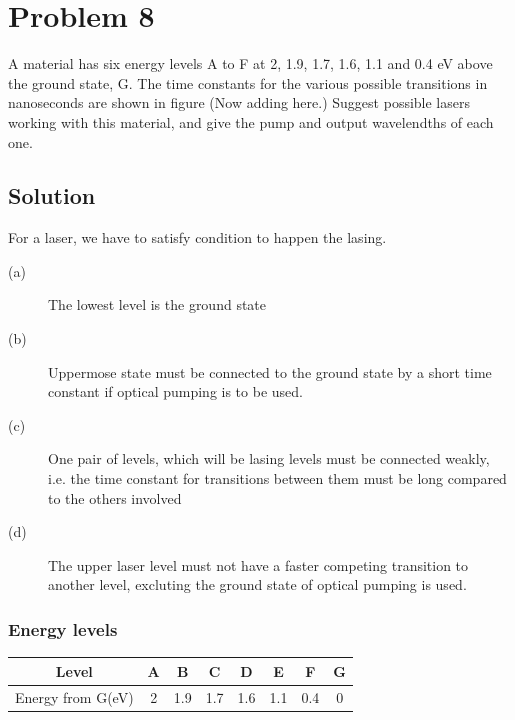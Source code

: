 \documentclass[a4paper,11pt]{article}
\begin{document}
\section*{Problem 8}
\label{sec:org0e387b5}
A material has six energy levels A to F at 2, 1.9, 1.7, 1.6, 1.1 and 0.4 eV above the ground state, G. The time constants for the various possible transitions in nanoseconds are shown in figure (Now adding here.) Suggest possible lasers working with this material, and give the pump and output wavelendths of each one.
\subsection*{Solution}
\label{sec:org515a892}

For a laser, we have to satisfy condition to happen the lasing.
\begin{description}
\item[{(a)}] The lowest level is the ground state
\item[{(b)}] Uppermose state must be connected to the ground state by a short time constant if optical pumping is to be used.
\item[{(c)}] One pair of levels, which will be lasing levels must be connected weakly, i.e. the time constant for transitions between them must be long compared to the others involved
\item[{(d)}] The upper laser level must not have a faster competing transition to another level, excluting the ground state of optical pumping is used.
\end{description}

\subsubsection*{Energy levels}
\label{sec:org30509e7}
\begin{center}
\begin{tabular}{|c|c|c|c|c|c|c|c|}
\hline
Level & A & B & C & D & E & F & G\\
\hline
Energy from G(eV) & 2 & 1.9 & 1.7 & 1.6 & 1.1 & 0.4 & 0\\
\hline
\end{tabular}
\end{center}
\end{document}
